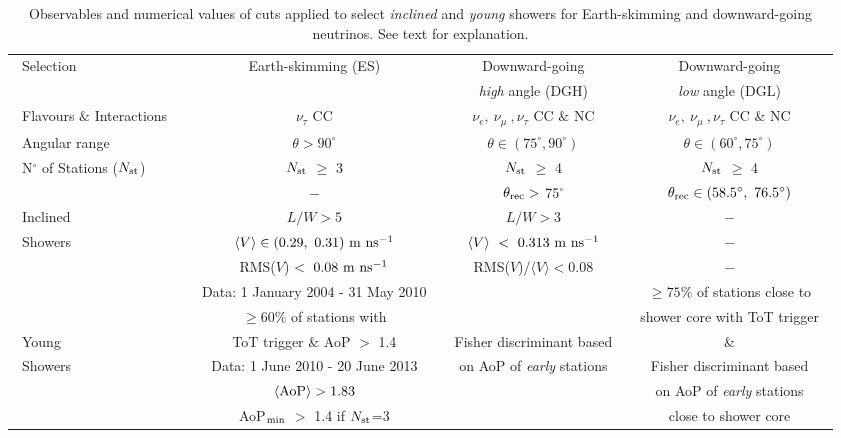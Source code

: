 \documentclass[reprint,showpacs,showkeys,amsmath,amssymb,aps,nofootinbib]{revtex4-1}
\begin{document}
\begin{table}[!t]
\begin{center}
\renewcommand{\arraystretch}{1.4}
\begin{tabular}{l|c|c|c}
\hline
~Selection & Earth-skimming (ES)           & Downward-going                        & Downward-going                       \\
          &                               & {\it high} angle (DGH)                & {\it low} angle (DGL)                \\
\hline 
~Flavours $\&$ Interactions~~ & $\nu_\tau$ CC & $\nu_e,~\nu_\mu~,\nu_\tau$ CC $\&$ NC &  $\nu_e,~\nu_\mu~,\nu_\tau$ CC $\&$ NC \\

~Angular range & $\theta>90^\circ$             & $\theta \in (75^\circ, 90^\circ)$ & $\theta \in (60^\circ, 75^\circ)$ \\

~N$^\circ$ of Stations ($N_{\rm st}$) & $N_{\rm st}$ $\geq$ 3   & $N_{\rm st}$ $\geq$ 4 & $N_{\rm st}$ $\geq$ 4 \\
\hline 
          & $-$                             & $\theta_{\rm rec}>$ 75$^{\circ}$   &   $\theta_{\rm rec}\in (58.5^\circ,~76.5^{\circ})$\\
~Inclined  & $L/W > 5$                                         & $L/W > 3$ & $-$ \\
~Showers   & $\langle V\rangle\in (0.29,~0.31)~{\rm m~ns^{-1}}$ & $\langle V \rangle~<~0.313~{\rm m~ns^{-1}}$ & $-$ \\
          & RMS($V$)$~<~0.08~{\rm m~ns^{-1}}$                 & RMS($V$)/$\langle V\rangle<0.08$ & $-$ \\
\hline 
          & ~Data: 1 January 2004 - 31 May 2010~ &                                     & $\geq 75\%$ of stations close to   \\
          & $\geq 60\%$ of stations with  &                                      & ~shower core with ToT trigger~       \\
~Young     & ToT trigger \& AoP $>$ 1.4    & ~Fisher discriminant based~         &                          \&        \\
~Showers   & Data: 1 June 2010 - 20 June 2013   & on AoP of {\it early} stations  & Fisher discriminant based  \\
          & $\langle {\rm AoP} \rangle> 1.83$  &                                 & on AoP of {\it early} stations  \\
          & AoP$_{\rm min}$ $>$ 1.4 if $N_{\rm st}$=3   &                                 & close to shower core        \\
\hline
\end{tabular}
\end{center}
\vskip -3mm
\caption{
Observables and numerical values of cuts applied to select {\it inclined} 
and {\it young} showers for Earth-skimming and downward-going neutrinos. See text for explanation.} 
\label{tab:cuts}
\end{table}
\end{document}
